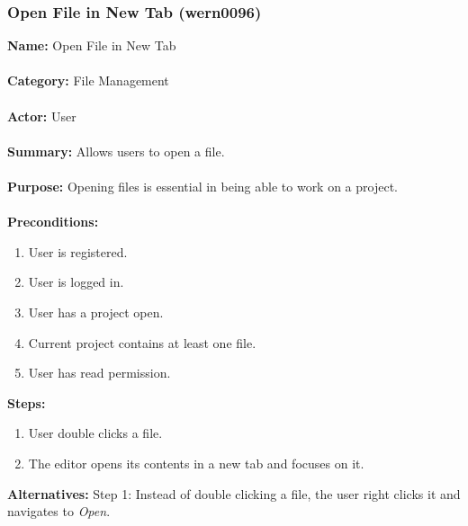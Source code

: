 \documentclass[11pt]{report}
\begin{document}
\newpage

\subsubsection{Open File in New Tab (wern0096)}
\begin{framed}
	\noindent\textbf{Name:} Open File in New Tab \\ \\
	\textbf{Category:} File Management \\ \\
	\textbf{Actor:} User \\ \\
	\textbf{Summary:} Allows users to open a file. \\ \\
	\textbf{Purpose:} Opening files is essential in being able to work on a project. \\ \\
	\textbf{Preconditions:} 
	\begin{enumerate}
		\item User is registered.
		\item User is logged in.
		\item User has a project open.
		\item Current project contains at least one file.
		\item User has read permission.
	\end{enumerate}		
	\textbf{Steps:}
	\begin{enumerate}
		\item User double clicks a file.
		\item The editor opens its contents in a new tab and focuses on it.
	\end{enumerate}	
	\textbf{Alternatives:} Step 1: Instead of double clicking a file, the user right clicks it and navigates to \textit{Open}.
\end{framed}

\newpage
\end{document}
